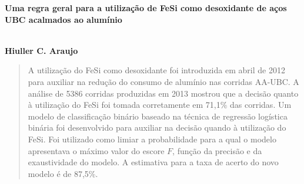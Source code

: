 \documentclass[10pt]{article}
\begin{document}
\begin{center}
\begin{huge}\textbf{
		Uma regra geral para a utilização de FeSi como desoxidante de aços UBC acalmados ao alumínio
	}\end{huge}\\[10pt]
\textbf{Hiuller C. Araujo
}\\

	\begin{abstract}
		A utilização do FeSi como desoxidante foi introduzida em abril de 2012 para auxiliar na redução do consumo de alumínio nas corridas AA-UBC. A análise de 5386 corridas produzidas em 2013 mostrou que a decisão quanto à utilização do FeSi foi tomada corretamente em 71,1\% das corridas. Um modelo de classificação binário baseado na técnica de regressão logística binária foi desenvolvido para auxiliar na decisão quando à utilização do FeSi. Foi utilizado como limiar a probabilidade para a qual o modelo apresentava o máximo valor do escore $F$, função da precisão e da exaustividade do modelo. A estimativa para a taxa de acerto do novo modelo é de 87,5\%.
	\end{abstract}
\end{center}





\begin{multicols}{2}

	


% 
\renewcommand{\bibname}{Referências}


\end{multicols}	
\end{document}
